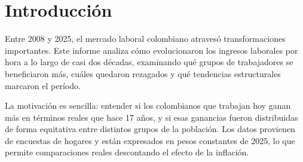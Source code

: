 \section{Introducción}

Entre 2008 y 2025, el mercado laboral colombiano atravesó transformaciones importantes. Este informe analiza cómo evolucionaron los ingresos laborales por hora a lo largo de casi dos décadas, examinando qué grupos de trabajadores se beneficiaron más, cuáles quedaron rezagados y qué tendencias estructurales marcaron el período.

La motivación es sencilla: entender si los colombianos que trabajan hoy ganan más en términos reales que hace 17 años, y si esas ganancias fueron distribuidas de forma equitativa entre distintos grupos de la población. Los datos provienen de encuestas de hogares y están expresados en pesos constantes de 2025, lo que permite comparaciones reales descontando el efecto de la inflación.